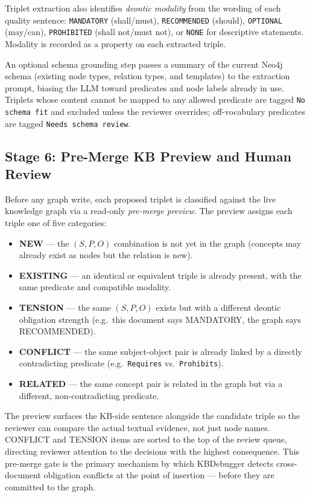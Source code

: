 Triplet extraction also identifies \emph{deontic modality} from the wording of each quality sentence: \texttt{MANDATORY} (shall/must), \texttt{RECOMMENDED} (should), \texttt{OPTIONAL} (may/can), \texttt{PROHIBITED} (shall not/must not), or \texttt{NONE} for descriptive statements. Modality is recorded as a property on each extracted triple.

An optional schema grounding step passes a summary of the current Neo4j schema (existing node types, relation types, and templates) to the extraction prompt, biasing the LLM toward predicates and node labels already in use. Triplets whose content cannot be mapped to any allowed predicate are tagged \texttt{No schema fit} and excluded unless the reviewer overrides; off-vocabulary predicates are tagged \texttt{Needs schema review}.

\subsection{Stage 6: Pre-Merge KB Preview and Human Review}

Before any graph write, each proposed triplet is classified against the live knowledge graph
via a read-only \emph{pre-merge preview}. The preview assigns each triple one of five
categories:

\begin{itemize}
    \item \textbf{NEW} — the $(S, P, O)$ combination is not yet in the graph (concepts may
    already exist as nodes but the relation is new).
    \item \textbf{EXISTING} — an identical or equivalent triple is already present, with the
    same predicate and compatible modality.
    \item \textbf{TENSION} — the same $(S, P, O)$ exists but with a different deontic
    obligation strength (e.g.\ this document says MANDATORY, the graph says RECOMMENDED).
    \item \textbf{CONFLICT} — the same subject-object pair is already linked by a directly
    contradicting predicate (e.g.\ \texttt{Requires} vs.\ \texttt{Prohibits}).
    \item \textbf{RELATED} — the same concept pair is related in the graph but via a
    different, non-contradicting predicate.
\end{itemize}

The preview surfaces the KB-side sentence alongside the candidate triple so the reviewer can
compare the actual textual evidence, not just node names. CONFLICT and TENSION items are
sorted to the top of the review queue, directing reviewer attention to the decisions with
the highest consequence. This pre-merge gate is the primary mechanism by which
KBDebugger detects cross-document obligation conflicts at the point of insertion —
before they are committed to the graph.

